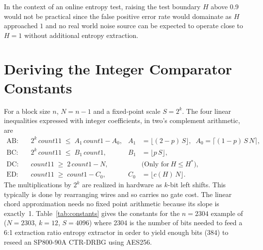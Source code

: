 \documentclass[11pt]{article}
\begin{document}
In the context of an online entropy test, raising the test boundary $H$ above
0.9 would not be practical since the false positive error rate would domainate
as $H$ approached $1$ and no real world noise source can be expected to operate
close to $H=1$ without additional entropy extraction.

\section{Deriving the Integer Comparator Constants}
\label{sec:integer}

For a block size $n$, $N=n-1$ and a fixed-point scale $S=2^k$. The
four linear inequalities expressed with integer coefficients,
in two's complement arithmetic, are
\begin{align}
\text{AB:}\quad & 2^k\,\mathit{count11} \;\le\; A_1\,\mathit{count1} - A_0,
& A_1 &= \lfloor (2-p)\,S \rfloor,\;\; A_0 = \lceil (1-p)\,S\,N \rceil,
\label{eq:ab}\\
\text{BC:}\quad & 2^k\,\mathit{count11} \;\le\; B_1\,\mathit{count1},
& B_1 &= \lfloor p\,S \rfloor,
\label{eq:bc}\\
\text{DC:}\quad & \mathit{count11} \;\ge\; 2\,\mathit{count1} - N,
& & \text{(Only for}\  H\le H^\ast\text{)},
\label{eq:dc}\\
\text{ED:}\quad & \mathit{count11} \;\ge\; \mathit{count1} - C_0,
& C_0 &= \lfloor c(H)\,N \rfloor.
\label{eq:ed}
\end{align}
The multiplications by $2^k$ are realized in hardware as $k$-bit left
shifts. This typically is done by rearranging wires and so carries no
gate cost. The linear chord approximation needs no fixed point arithmetic 
because its slope is exactly~1.
Table~\ref{tab:constants} gives the constants for the $n=2304$ example
of~\cite{johnston2024} ($N=2303$, $k=12$, $S=4096$) where 2304 is the
number of bits needed to feed a 6:1 extraction ratio entropy extractor
in order to yield enough bits (384) to reseed an SP800-90A\cite{SP80090A} CTR-DRBG using AES256.
\end{document}
